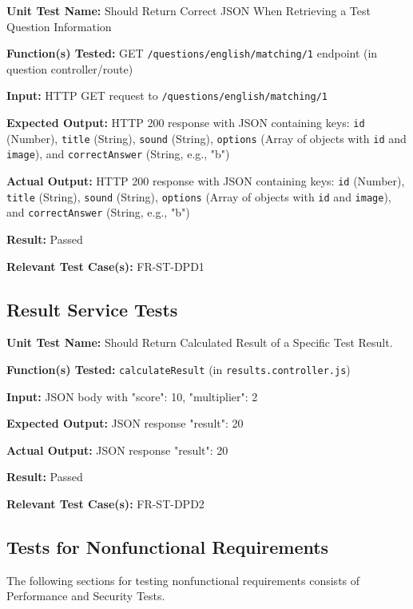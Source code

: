 \documentclass[12pt, titlepage]{article}
\begin{document}
\begin{mdframed}[linewidth=0.5mm]
\textbf{Unit Test Name:} Should Return Correct JSON When Retrieving a Test Question Information \par
\textbf{Function(s) Tested:} GET \texttt{/questions/english/matching/1} endpoint (in question controller/route) \par
\textbf{Input:} HTTP GET request to \texttt{/questions/english/matching/1} \par
\textbf{Expected Output:} HTTP 200 response with JSON containing keys: \texttt{id} (Number), \texttt{title} (String), \texttt{sound} (String), \texttt{options} (Array of objects with \texttt{id} and \texttt{image}), 
and \texttt{correctAnswer} (String, e.g., "b") \par
\textbf{Actual Output:}  HTTP 200 response with JSON containing keys: \texttt{id} (Number), \texttt{title} (String), \texttt{sound} (String), \texttt{options} (Array of objects with \texttt{id} and \texttt{image}), 
and \texttt{correctAnswer} (String, e.g., "b") \par
\textbf{Result:} Passed \par
\textbf{Relevant Test Case(s):} FR-ST-DPD1
\end{mdframed}

\subsection*{Result Service Tests}

\begin{mdframed}[linewidth=0.5mm]
\textbf{Unit Test Name:} Should Return Calculated Result of a Specific Test Result. \par
\textbf{Function(s) Tested:} \texttt{calculateResult} (in \texttt{results.controller.js}) \par
\textbf{Input:} JSON body with {"score": 10, "multiplier": 2} \par
\textbf{Expected Output:} JSON response {"result": 20} \par
\textbf{Actual Output:} JSON response {"result": 20} \par
\textbf{Result:} Passed \par
\textbf{Relevant Test Case(s):} FR-ST-DPD2
\end{mdframed}

\subsection{Tests for Nonfunctional Requirements}
\hspace{2em} The following sections for testing nonfunctional requirements consists of Performance and Security Tests.
\end{document}
